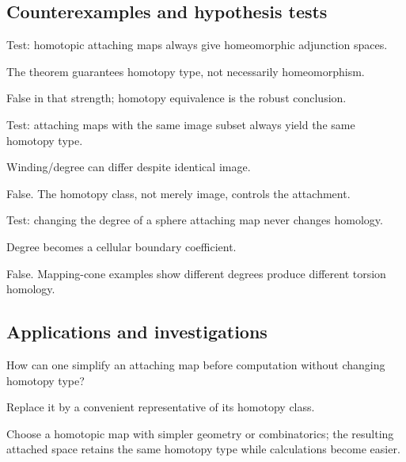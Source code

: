 \subsection*{Counterexamples and hypothesis tests}

\begin{exercise}\label{exr:viii08-ped-10}
Test: homotopic attaching maps always give homeomorphic adjunction spaces.
\end{exercise}
\begin{hint}
The theorem guarantees homotopy type, not necessarily homeomorphism.
\end{hint}
\begin{solution}
False in that strength; homotopy equivalence is the robust conclusion.
\end{solution}

\begin{exercise}\label{exr:viii08-ped-11}
Test: attaching maps with the same image subset always yield the same homotopy type.
\end{exercise}
\begin{hint}
Winding/degree can differ despite identical image.
\end{hint}
\begin{solution}
False.  The homotopy class, not merely image, controls the attachment.
\end{solution}

\begin{exercise}\label{exr:viii08-ped-12}
Test: changing the degree of a sphere attaching map never changes homology.
\end{exercise}
\begin{hint}
Degree becomes a cellular boundary coefficient.
\end{hint}
\begin{solution}
False.  Mapping-cone examples show different degrees produce different torsion homology.
\end{solution}

\subsection*{Applications and investigations}

\begin{exercise}\label{exr:viii08-ped-13}
How can one simplify an attaching map before computation without changing homotopy type?
\end{exercise}
\begin{hint}
Replace it by a convenient representative of its homotopy class.
\end{hint}
\begin{solution}
Choose a homotopic map with simpler geometry or combinatorics; the resulting attached space retains the same homotopy type while calculations become easier.
\end{solution}

